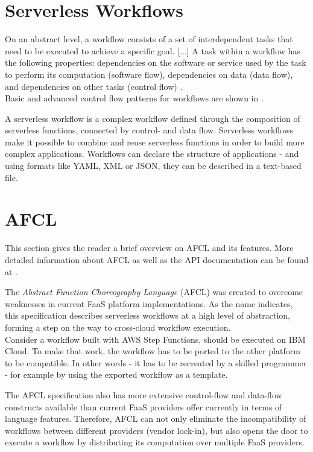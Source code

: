 \documentclass[a4paper,top=25mm,bottom=25mm,12pt,pdftex,halfparskip,twoside,bibtotoc,numbers=noenddot]{scrbook}
\begin{document}
\section{Serverless Workflows}
On an abstract level, a workflow consists of a set of interdependent tasks that need to be executed to achieve a specific goal. [...] A task within a workflow has the following properties: dependencies on the software or service used by the task to perform its computation (software flow), dependencies on data (data flow), and dependencies on other tasks (control flow) \cite{thesis-design-serverless-worfklow-system-eyk}.\\
Basic and advanced control flow patterns for workflows are shown in \cite{reports-workflow-control-patterns-russell}.

A serverless workflow is a complex workflow defined through the composition of serverless functions, connected by control- and data flow. Serverless workflows make it possible to combine and reuse serverless functions in order to build more complex applications. 
Workflows can declare the structure of applications - and using formats like YAML, XML or JSON, they can be described in a text-based file.

\section{AFCL}

This section gives the reader a brief overview on AFCL and its features. More detailed information about AFCL as well as the API documentation can be found at \cite{online-afcl-dps}.

The \emph{Abstract Function Choreography Language} (AFCL) was created to overcome weaknesses in current FaaS platform implementations. As the name indicates, this specification describes serverless workflows at a high level of abstraction, forming a step on the way to cross-cloud workflow execution.\\
Consider a workflow built with AWS Step Functions, should be executed on IBM Cloud. To make that work, the workflow has to be ported to the other platform to be compatible. In other words - it has to be recreated by a skilled programmer - for example by using the exported workflow as a template.

The AFCL specification also has more extensive control-flow and data-flow constructs available than current FaaS providers offer currently in terms of language features. Therefore, AFCL can not only eliminate the incompatibility of workflows between different providers (vendor lock-in), but also opens the door to execute a workflow by distributing its computation over multiple FaaS providers.
\end{document}
